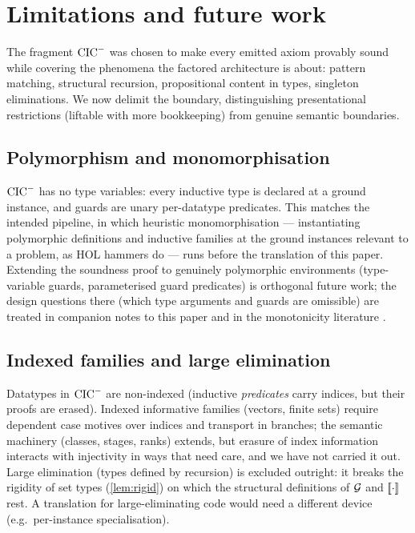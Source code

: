 \section{Limitations and future work}
\label{sec:limitations}

The fragment $\mathrm{CIC}^{-}$ was chosen to make every emitted axiom provably
sound while covering the phenomena the factored architecture is about:
pattern matching, structural recursion, propositional content in types,
singleton eliminations.  We now delimit the boundary, distinguishing
presentational restrictions (liftable with more bookkeeping) from
genuine semantic boundaries.

\subsection{Polymorphism and monomorphisation}
\label{sec:limitations-poly}

$\mathrm{CIC}^{-}$ has no type variables: every inductive type is declared at a
ground instance, and guards are unary per-datatype predicates.  This
matches the intended pipeline, in which heuristic monomorphisation ---
instantiating polymorphic definitions and inductive families at the
ground instances relevant to a problem, as HOL hammers do
\cite{BlanchetteEtAl2016} --- runs before the translation of this paper.
Extending the soundness proof to genuinely polymorphic environments
(type-variable guards, parameterised guard predicates) is orthogonal
future work; the design questions there (which type arguments and guards
are omissible) are treated in companion notes to this paper and in the
monotonicity literature \cite{BlanchetteEtAl2016}.

\subsection{Indexed families and large elimination}
\label{sec:limitations-indexed}

Datatypes in $\mathrm{CIC}^{-}$ are non-indexed (inductive \emph{predicates} carry
indices, but their proofs are erased).  Indexed informative families
(vectors, finite sets) require dependent case motives over indices and
transport in branches; the semantic machinery (classes, stages, ranks)
extends, but erasure of index information interacts with injectivity in
ways that need care, and we have not carried it out.  Large elimination
(types defined by recursion) is excluded outright: it breaks the rigidity
of set types (\cref{lem:rigid}) on which the structural definitions of
$\mathcal{G}$ and $[\![ \cdot ]\!]_{}$ rest.  A translation for large-eliminating
code would need a different device (e.g.\ per-instance specialisation).

